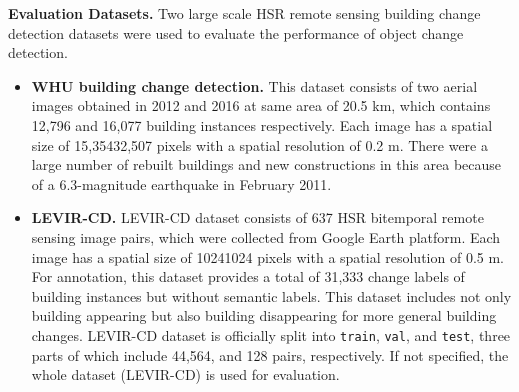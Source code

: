\documentclass[10pt,twocolumn,letterpaper]{article}
\begin{document}
\noindent\textbf{Evaluation Datasets.}
Two large scale HSR remote sensing building change detection datasets were used to evaluate the performance of object change detection.
\begin{itemize}
    \vspace{-0.05in}
    \item \textbf{WHU building change detection.} This dataset \cite{ji2018fully} consists of two aerial images obtained in 2012 and 2016 at same area of 20.5 km, which contains 12,796 and 16,077 building instances respectively.
          Each image has a spatial size of 15,35432,507 pixels with a spatial resolution of 0.2 m.
          There were a large number of rebuilt buildings and new constructions in this area because of a 6.3-magnitude earthquake in February 2011.
          \vspace{-0.05in}
    \item \textbf{LEVIR-CD.} LEVIR-CD dataset \cite{chen2020spatial} consists of 637 HSR bitemporal remote sensing image pairs, which were collected from Google Earth platform.
          Each image has a spatial size of 10241024 pixels with a spatial resolution of 0.5 m.
          For annotation, this dataset provides a total of 31,333 change labels of building instances but without semantic labels.
          This dataset includes not only building appearing but also building disappearing for more general building changes.
          LEVIR-CD dataset is officially split into \texttt{train}, \texttt{val}, and \texttt{test}, three parts of which include 44,564, and 128 pairs, respectively.
          If not specified, the whole dataset (LEVIR-CD) is used for evaluation.
\end{itemize}
\end{document}
